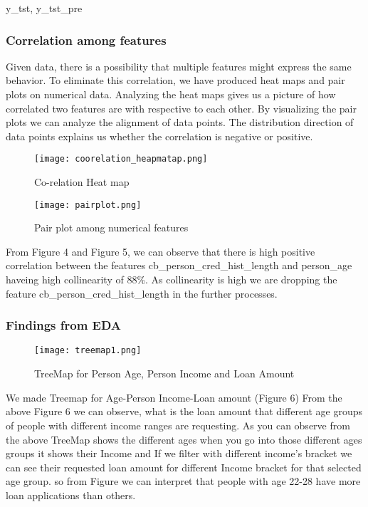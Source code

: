 y_tst, y_tst_pre\documentclass[12pt]{article}
\begin{document}
\subsubsection{Correlation among features}

Given data, there is a possibility that multiple features might express the same behavior. To eliminate this correlation, we have produced heat maps and pair plots on numerical data. Analyzing the heat maps gives us a picture of how correlated two features are with respective to each other. By visualizing the pair plots we can analyze the alignment of data points. The distribution direction of data points explains us whether the correlation is negative or positive.

\begin{figure}[h] %
\centering
\texttt{[image: coorelation\_heapmatap.png]}
\caption{Co-relation Heat map}
\end{figure}
\begin{figure}[h] %
\centering
\texttt{[image: pairplot.png]}
\caption{Pair plot among numerical features}
\end{figure}

From Figure 4 and Figure 5, we can observe that there is high positive correlation between the features cb\_person\_cred\_hist\_length and person\_age haveing high collinearity of 88\%. As collinearity is high we are dropping the feature cb\_person\_cred\_hist\_length in the further processes.




\subsubsection{Findings from EDA}

\begin{figure}[!h] %
\centering
\texttt{[image: treemap1.png]}
\caption{TreeMap for Person Age, Person Income and Loan Amount}
\end{figure}
We made Treemap for Age-Person Income-Loan amount (Figure 6)
From the above Figure 6 we can observe, what is the loan amount that different age groups of people with different income ranges are requesting.
As you can observe from the above TreeMap shows the different ages when you go into those different ages groups it shows their Income and If we filter with different income's bracket we can see their requested loan amount for different Income bracket for that selected age group.
so from Figure we can interpret that people with age 22-28 have more loan applications than others.
\end{document}
